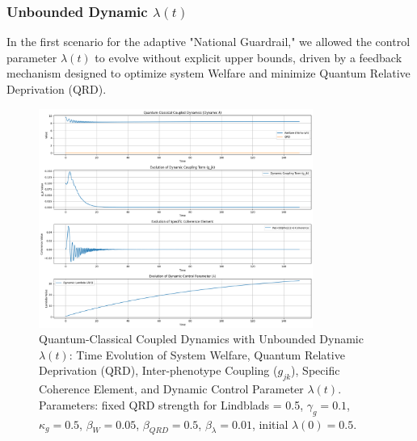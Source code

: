\documentclass[9pt]{article}
\begin{document}
\subsubsection{Unbounded Dynamic \texorpdfstring{$\lambda(t)$}{lambda(t)}} \label{sec:dynamic_lambda_unbounded_section}
In the first scenario for the adaptive "National Guardrail," we allowed the control parameter $\lambda(t)$ to evolve without explicit upper bounds, driven by a feedback mechanism designed to optimize system Welfare and minimize Quantum Relative Deprivation (QRD).

\begin{figure}[h!]
    \centering
    \includegraphics[width=0.8\textwidth]{phenotourfig4.png} 
    \caption{Quantum-Classical Coupled Dynamics with Unbounded Dynamic $\lambda(t)$: Time Evolution of System Welfare, Quantum Relative Deprivation (QRD), Inter-phenotype Coupling ($g_{jk}$), Specific Coherence Element, and Dynamic Control Parameter $\lambda(t)$. Parameters: fixed QRD strength for Lindblads = 0.5, $\gamma_g = 0.1$, $\kappa_g = 0.5$, $\beta_W = 0.05$, $\beta_{QRD} = 0.5$, $\beta_{\lambda} = 0.01$, initial $\lambda(0) = 0.5$.}
    \label{fig:unbounded_dynamic_lambda}
\end{figure}
\end{document}
